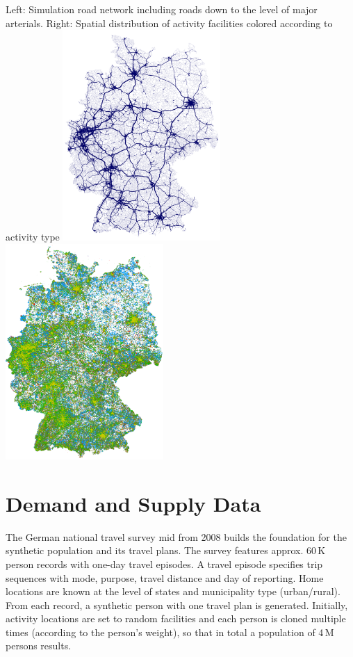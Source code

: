 \createfigure%
{}%
{Left: Simulation road network including roads down to the level of major arterials. Right: Spatial distribution of activity facilities colored according to activity type}%
{\label{fig:germany:network}}%
{\includegraphics[width=0.45\textwidth, angle=0]{./scenarios/figures/germany-network}\hspace{5mm}\includegraphics[width=0.45\textwidth, angle=0]{./scenarios/figures/germany-facilities}}%
{}

\section{Demand and Supply Data}

The German national travel survey \gls{mid} from 2008 \citep{Follmer2010MiD} builds the foundation for the synthetic population and its travel plans. The survey features approx. 60\,K person records with one-day travel episodes. A travel episode specifies trip sequences with mode, purpose, travel distance and day of reporting. Home locations are known at the level of states and municipality type (urban/rural). From each record, a synthetic person with one travel plan is generated. Initially, activity locations are set to random facilities and each person is cloned multiple times (according to the person's weight), so that in total a population of 4\,M persons results.

